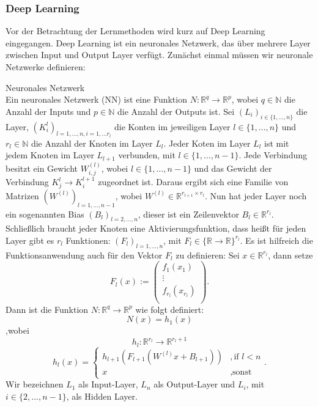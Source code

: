 \documentclass[12pt,letterpaper,ngerman]{article}
\begin{document}
\subsubsection{Deep Learning}
Vor der Betrachtung der Lernmethoden wird kurz auf Deep Learning eingegangen.
Deep Learning ist ein neuronales Netzwerk, das über mehrere Layer zwischen
Input und Output Layer verfügt.  
Zunächst einmal müssen wir neuronale Netzwerke definieren:
\begin{definition}{Neuronales Netzwerk}
  \\
  Ein neuronales Netzwerk (NN) ist eine Funktion $N: \mathbb{R}^q \to \mathbb{R}^p$,
  wobei $q\in \mathbb{N}$ die Anzahl der Inputs und $p \in \mathbb{N}$ die
  Anzahl der Outputs ist. Sei $(L_i)_{i \in \{ 1, \dots, n\}}$ die Layer,
  $(K_i^l)_{l=1,\dots, n, i = 1,\dots r_l}$ die Konten im jeweiligen Layer 
  $l \in \{1, \dots, n\}$ und $r_l \in \mathbb{N}$ die Anzahl der Knoten im
  Layer $L_l$. Jeder Koten im Layer $L_l$ ist mit jedem Knoten im 
  Layer $L_{l+1}$ verbunden, mit $l \in \{1,\dots, n-1\}$. Jede Verbindung
  besitzt ein Gewicht $W_{i,j}^{(l)}$, wobei $l \in \{1,\dots, n-1\}$ und 
  das Gewicht der Verbindung $K^l_j \to K^{l+1}_i$ zugeordnet ist.
  Daraus ergibt sich eine Familie von Matrizen 
  $(W^{(l)})_{l=1,\dots, n-1}$, wobei 
  $ W^{(l)}\in \mathbb{R}^{r_{l+1}\times r_{l}}$.
  Nun hat jeder Layer noch ein sogenannten Bias $(B_l)_{l = 2,\dots,n}$,
  dieser ist ein Zeilenvektor $B_l \in \mathbb{R}^{r_l}$.
  Schließlich braucht jeder Knoten eine Aktivierungsfunktion, dass heißt
  für jeden Layer gibt es $r_l$ Funktionen:
  $(F_l)_{l=1,\dots,n}$, mit $F_l \in \{\mathbb{R} \to \mathbb{R}\}^{r_l}$.
  Es ist hilfreich die Funktionsanwendung auch für den Vektor $F_l$ zu definieren:
  Sei $x \in \mathbb{R}^{r_l}$, dann setze
  \[
    F_l(x) := \begin{pmatrix} 
        f_1(x_1) \\
        \vdots\\
        f_{r_l}(x_{r_l})\\
    \end{pmatrix}.
  \]
  Dann ist die Funktion $N: \mathbb{R}^q \to \mathbb{R}^p$ wie folgt definiert:
  \[
    N(x) = h_1(x)
  \]
  ,wobei
  \[h_l: \mathbb{R}^{r_l} \to \mathbb{R}^{r_l+1}\]
  \[
    h_l(x) = 
      \begin{cases}
        h_{l+1}(F_{l+1}(W^{(l)}x + B_{l+1}))& ,  \text{if } l < n  \\
        x & , \text{sonst}
      \end{cases}.
  \]
  Wir bezeichnen $L_1$ als Input-Layer, $L_n$ als Output-Layer und
  $L_i$, mit $i \in \{2, \dots, n-1\}$, als Hidden Layer.
\end{definition}
\end{document}
